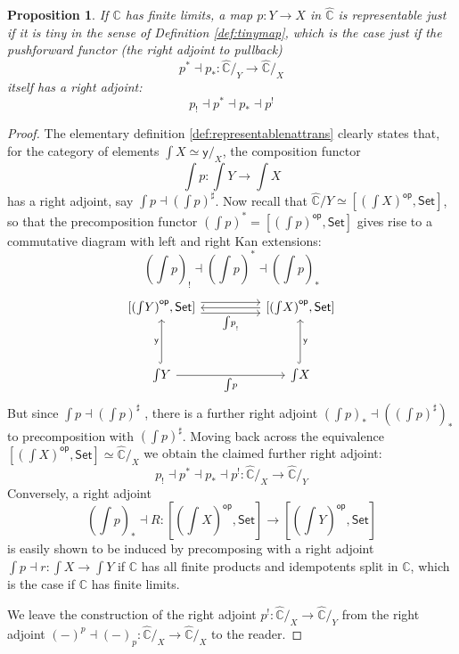 \documentclass[12pt,reqno]{amsart}
\newcommand{\C}{\ensuremath{\mathbb{C}}}
\newcommand{\op}[1]{\ensuremath{{#1}^{\mathsf{op}}}}
\newcommand{\psh}[1]{\ensuremath{[\op{#1},\mathsf{Set}]}}
\newcommand{\y}{\ensuremath{\mathsf{y}}} %
\renewcommand{\to}{\ensuremath{\rightarrow}}
\newcommand{\too}{\ensuremath{\longrightarrow}}
\newtheorem{proposition}[theorem]{Proposition}
\theoremstyle{remark}
\theoremstyle{definition}
\begin{document}
\begin{proposition}\label{prop:rep_is_tiny}
If $\C$ has finite limits, a map $p : Y \to X$ in $\widehat{\C}$ is representable just if it is tiny in the sense of Definition \ref{def:tinymap}, which is the case just if the \emph{pushforward functor} (the right adjoint to pullback) 
\[
p^* \dashv p_* : \widehat{\C}/_{Y} \longrightarrow \widehat{\C}/_{X}
\] 
itself has a \emph{right} adjoint:
\[
p_! \dashv p^*\dashv p_* \dashv  p^!
\]
\end{proposition}

\begin{proof}
The elementary definition \ref{def:representablenattrans} clearly states that, for the category of elements ${\int\!X} \simeq {\y{}/_X}$, the composition functor 
\[\textstyle
{\int\!p} : {\int\!Y} \to {\int\!X}
\]  
has a right adjoint, say ${\int\!p} \dashv ({\int\!p})^\sharp$. Now recall that $\widehat{\C}/{Y} \simeq \psh{(\int\!X)}$, so that the precomposition functor $({\int\!p})^* = \psh{({\int\!p})}$ gives rise to a commutative diagram with left and right Kan extensions:
\[\textstyle
({\int\!p})_!\dashv ({\int\!p})^* \dashv ({\int\!p})_*
\]
%
\begin{equation}\begin{tikzcd}
\psh{(\int{\!Y})} \ar[rr,shift right = 1ex,swap, "{\int\!p}_!"]  \ar[rr,shift left = 1ex] &&   \psh{(\int{\!X})} \ar[ll] \\
&& \\
\int{\!Y} \ar[uu, hook, "{\y{}}"]  \ar[rr, swap, "{\int\!p}"]  &&  \int{\!X} \ar[uu, swap,hook, "{\y{}}"]
\end{tikzcd}\end{equation}
%
But since ${\int\!p} \dashv ({\int\!p})^\sharp$ , there is a further right adjoint $({\int\!p})_* \dashv (({\int\!p})^\sharp)_*$ to precomposition with $({\int\!p})^\sharp$.  Moving back across the equivalence $\psh{(\int\!X)} \simeq \widehat{\C}/_{X}$ we obtain the claimed further right adjoint: 
\[
p_! \dashv p^* \dashv p_*\dashv p^! :  \widehat{\C}/_{X} \too \widehat{\C}/_{Y}
\]
%
Conversely, a right adjoint $$\textstyle ({\int\!p})_* \dashv R : \psh{(\int{\!X})} \to \psh{(\int{\!Y})}$$ is easily shown to be induced by precomposing with a right adjoint ${\int\!p} \dashv r : {\int\!X} \to {\int\!Y}$ if $\C$ has all finite products and idempotents split in $\C$, which is the case if $\C$ has finite limits.

We leave the construction of the right adjoint $p^!:  \widehat{\C}/_{X} \too \widehat{\C}/_{Y}$ from the right adjoint $(-)^p \dashv (-)_p : \widehat{\C}/_{X} \to \widehat{\C}/_{X}$ to the reader.
\end{proof}
\end{document}
